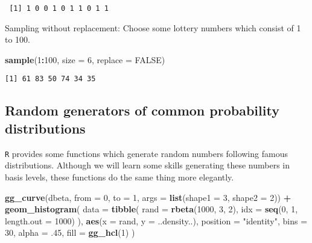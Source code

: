 \documentclass[]{book}
\newenvironment{Shaded}{\begin{snugshade}}{\end{snugshade}}
\newcommand{\KeywordTok}[1]{\textcolor[rgb]{0.13,0.29,0.53}{\textbf{#1}}}
\newcommand{\DataTypeTok}[1]{\textcolor[rgb]{0.13,0.29,0.53}{#1}}
\newcommand{\DecValTok}[1]{\textcolor[rgb]{0.00,0.00,0.81}{#1}}
\newcommand{\StringTok}[1]{\textcolor[rgb]{0.31,0.60,0.02}{#1}}
\newcommand{\OtherTok}[1]{\textcolor[rgb]{0.56,0.35,0.01}{#1}}
\newcommand{\OperatorTok}[1]{\textcolor[rgb]{0.81,0.36,0.00}{\textbf{#1}}}
\newcommand{\NormalTok}[1]{#1}
\theoremstyle{definition}
\theoremstyle{definition}
\theoremstyle{definition}
\theoremstyle{remark}
\begin{document}
\begin{verbatim}
 [1] 1 0 0 1 0 1 1 0 1 1
\end{verbatim}

Sampling without replacement: Choose some lottery numbers which consist
of 1 to 100.

\begin{Shaded}
\begin{Highlighting}[]
\KeywordTok{sample}\NormalTok{(}\DecValTok{1}\OperatorTok{:}\DecValTok{100}\NormalTok{, }\DataTypeTok{size =} \DecValTok{6}\NormalTok{, }\DataTypeTok{replace =} \OtherTok{FALSE}\NormalTok{)}
\end{Highlighting}
\end{Shaded}

\begin{verbatim}
[1] 61 83 50 74 34 35
\end{verbatim}

\subsection*{Random generators of common probability
distributions}\label{random-generators-of-common-probability-distributions}

\texttt{R} provides some functions which generate random numbers
following famous distributions. Although we will learn some skills
generating these numbers in basis levels, these functions do the same
thing more elegantly.

\begin{Shaded}
\begin{Highlighting}[]
\KeywordTok{gg_curve}\NormalTok{(dbeta, }\DataTypeTok{from =} \DecValTok{0}\NormalTok{, }\DataTypeTok{to =} \DecValTok{1}\NormalTok{, }\DataTypeTok{args =} \KeywordTok{list}\NormalTok{(}\DataTypeTok{shape1 =} \DecValTok{3}\NormalTok{, }\DataTypeTok{shape2 =} \DecValTok{2}\NormalTok{)) }\OperatorTok{+}
\StringTok{  }\KeywordTok{geom_histogram}\NormalTok{(}
    \DataTypeTok{data =} \KeywordTok{tibble}\NormalTok{(}
      \DataTypeTok{rand =} \KeywordTok{rbeta}\NormalTok{(}\DecValTok{1000}\NormalTok{, }\DecValTok{3}\NormalTok{, }\DecValTok{2}\NormalTok{),}
      \DataTypeTok{idx =} \KeywordTok{seq}\NormalTok{(}\DecValTok{0}\NormalTok{, }\DecValTok{1}\NormalTok{, }\DataTypeTok{length.out =} \DecValTok{1000}\NormalTok{)}
\NormalTok{    ),}
    \KeywordTok{aes}\NormalTok{(}\DataTypeTok{x =}\NormalTok{ rand, }\DataTypeTok{y =}\NormalTok{ ..density..),}
    \DataTypeTok{position =} \StringTok{"identity"}\NormalTok{,}
    \DataTypeTok{bins =} \DecValTok{30}\NormalTok{,}
    \DataTypeTok{alpha =}\NormalTok{ .}\DecValTok{45}\NormalTok{,}
    \DataTypeTok{fill =} \KeywordTok{gg_hcl}\NormalTok{(}\DecValTok{1}\NormalTok{)}
\NormalTok{  )}
\end{Highlighting}
\end{Shaded}
\end{document}
